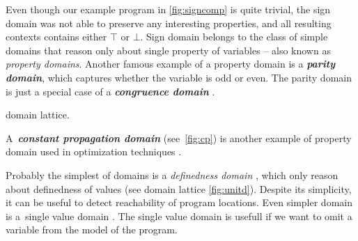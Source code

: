 Even though our example program in \autoref{fig:signcomp} is quite trivial, the
sign domain  was not able to preserve any interesting properties,
and all resulting contexts contains either $\top$ or $\bot$.  Sign domain belongs to
the class of simple domains that reason only about single property of variables --
also known as \emph{property domains}. Another famous example of a property
domain is a \textbf{\emph{parity domain}}, which captures whether the
variable is odd or even. The parity domain is just a special case of a
\textbf{\emph{congruence domain}} \cite{Granger1989, Granger1991}.
\begin{marginfigure}%
    \centering
{}
    \caption{ domain lattice.}
    \label{fig:cp}%
\end{marginfigure}%
A~\textbf{\emph{constant propagation domain}} 
(see~\autoref{fig:cp}) is another example of property domain used in
optimization techniques \cite{Kildall1973}.

Probably the simplest of domains is a \emph{definedness domain} , which only
reason about definedness of values (see domain lattice \autoref{fig:unitd}).
Despite its simplicity, it can be useful to detect reachability of program
locations. Even simpler domain is a~single value domain . The single
value domain is usefull if we want to omit a variable from the model of the
program.

